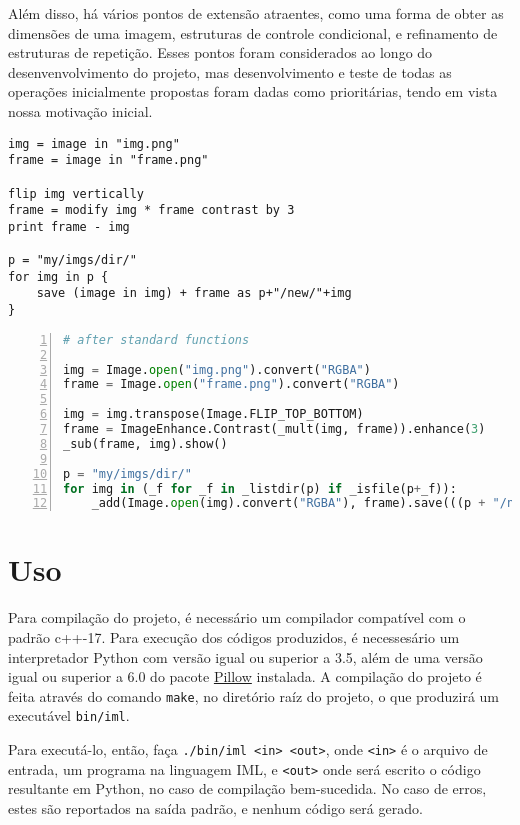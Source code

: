 \documentclass{article}
\begin{document}
Além disso, há vários pontos de extensão atraentes, como uma forma de obter as dimensões de uma imagem, estruturas de controle condicional, e refinamento de estruturas de repetição. Esses pontos foram considerados ao longo do desenvenvolvimento do projeto, mas desenvolvimento e teste de todas as operações inicialmente propostas foram dadas como prioritárias, tendo em vista nossa motivação inicial.

\begin{lstlisting}[language=IML]
img = image in "img.png"
frame = image in "frame.png"

flip img vertically
frame = modify img * frame contrast by 3
print frame - img

p = "my/imgs/dir/"
for img in p {
	save (image in img) + frame as p+"/new/"+img
}
\end{lstlisting}

\begin{lstlisting}[language=Python, numbers=left, numberstyle=\scriptsize]
# after standard functions

img = Image.open("img.png").convert("RGBA")
frame = Image.open("frame.png").convert("RGBA")

img = img.transpose(Image.FLIP_TOP_BOTTOM)
frame = ImageEnhance.Contrast(_mult(img, frame)).enhance(3)
_sub(frame, img).show()

p = "my/imgs/dir/"
for img in (_f for _f in _listdir(p) if _isfile(p+_f)):
    _add(Image.open(img).convert("RGBA"), frame).save(((p + "/new/") + img))
\end{lstlisting}

\appendix
\section{Uso}
\label{sec:uso}
Para compilação do projeto, é necessário um compilador compatível com o padrão c++-17. Para execução dos códigos produzidos, é necessesário um interpretador Python com versão igual ou superior a 3.5, além de uma versão igual ou superior a 6.0 do pacote \href{https://python-pillow.org/}{Pillow} instalada. A compilação do projeto é feita através do comando \texttt{make}, no diretório raíz do projeto, o que produzirá um executável \texttt{bin/iml}.

Para executá-lo, então, faça \texttt{./bin/iml <in> <out>}, onde \texttt{<in>} é o arquivo de entrada, um programa na linguagem IML, e \texttt{<out>} onde será escrito o código resultante em Python, no caso de compilação bem-sucedida. No caso de erros, estes são reportados na saída padrão, e nenhum código será gerado.
\end{document}
